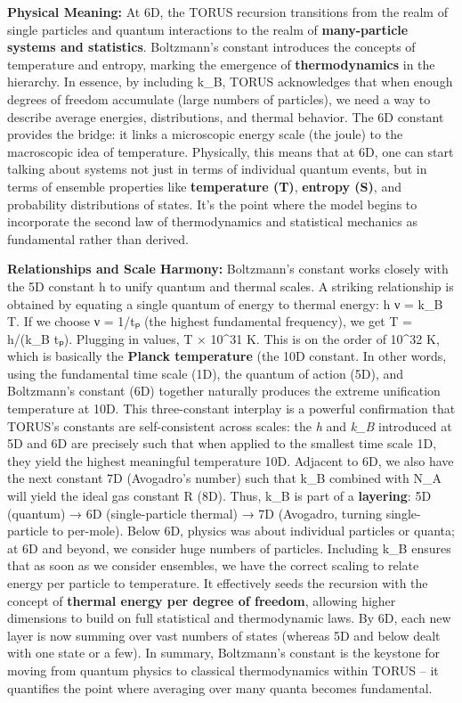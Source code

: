 \documentclass[
]{article}
\begin{document}
{\textbf{Physical Meaning:} At 6D, the TORUS recursion transitions from
the realm of single particles and quantum interactions to the realm of
\textbf{many-particle systems and statistics}. Boltzmann's constant
introduces the concepts of temperature and entropy, marking the
emergence of \textbf{thermodynamics} in the hierarchy\hspace{0pt}. In
essence, by including k\_B, TORUS acknowledges that when enough degrees
of freedom accumulate (large numbers of particles), we need a way to
describe average energies, distributions, and thermal behavior. The 6D
constant provides the bridge: it links a microscopic energy scale (the
joule) to the macroscopic idea of temperature. Physically, this means
that at 6D, one can start talking about systems not just in terms of
individual quantum events, but in terms of ensemble properties like
\textbf{temperature (T)}, \textbf{entropy (S)}, and probability
distributions of states. It's the point where the model begins to
incorporate the second law of thermodynamics and statistical mechanics
as fundamental rather than derived.

\textbf{Relationships and Scale Harmony:} Boltzmann's constant works
closely with the 5D constant h to unify quantum and thermal scales. A
striking relationship is obtained by equating a single quantum of energy
to thermal energy: h ν = k\_B T. If we choose ν = 1/tₚ (the highest
fundamental frequency), we get T = h/(k\_B tₚ). Plugging in values, T  × 10\^{}31 K\hspace{0pt}. This is on the order of 10\^{}32 K, which
is basically the \textbf{Planck temperature} (the 10D constant. In other
words, using the fundamental time scale (1D), the quantum of action
(5D), and Boltzmann's constant (6D) together naturally produces the
extreme unification temperature at 10D. This three-constant interplay is
a powerful confirmation that TORUS's constants are self-consistent
across scales: the \emph{h} and \emph{k\_B} introduced at 5D and 6D are
precisely such that when applied to the smallest time scale 1D, they
yield the highest meaningful temperature 10D\hspace{0pt}. Adjacent to
6D, we also have the next constant 7D (Avogadro's number) such that k\_B
combined with N\_A will yield the ideal gas constant R (8D)\hspace{0pt}.
Thus, k\_B is part of a \textbf{layering}: 5D (quantum) → 6D
(single-particle thermal) → 7D (Avogadro, turning single-particle to
per-mole). Below 6D, physics was about individual particles or quanta;
at 6D and beyond, we consider huge numbers of particles. Including k\_B
ensures that as soon as we consider ensembles, we have the correct
scaling to relate energy per particle to temperature. It effectively
seeds the recursion with the concept of \textbf{thermal energy per
degree of freedom}, allowing higher dimensions to build on full
statistical and thermodynamic laws. By 6D, each new layer is now summing
over vast numbers of states (whereas 5D and below dealt with one state
or a few). In summary, Boltzmann's constant is the keystone for moving
from quantum physics to classical thermodynamics within TORUS -- it
quantifies the point where averaging over many quanta becomes
fundamental.

}
\end{document}
